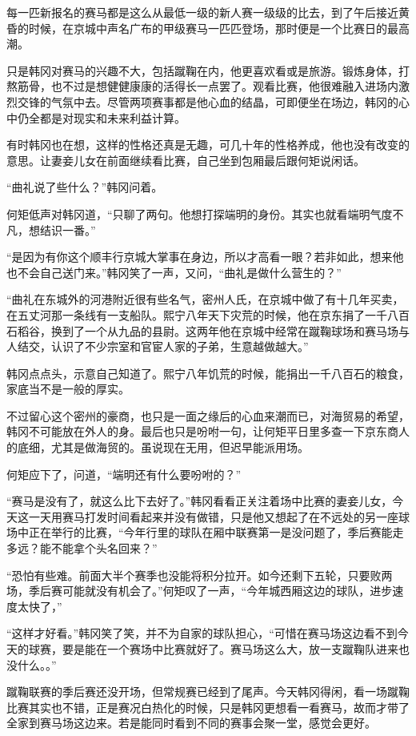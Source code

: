 每一匹新报名的赛马都是这么从最低一级的新人赛一级级的比去，到了午后接近黄昏的时候，在京城中声名广布的甲级赛马一匹匹登场，那时便是一个比赛日的最高潮。

只是韩冈对赛马的兴趣不大，包括蹴鞠在内，他更喜欢看或是旅游。锻炼身体，打熬筋骨，也不过是想健健康康的活得长一点罢了。观看比赛，他很难融入进场内激烈交锋的气氛中去。尽管两项赛事都是他心血的结晶，可即便坐在场边，韩冈的心中仍全都是对现实和未来利益计算。

有时韩冈也在想，这样的性格还真是无趣，可几十年的性格养成，他也没有改变的意思。让妻妾儿女在前面继续看比赛，自己坐到包厢最后跟何矩说闲话。

“曲礼说了些什么？”韩冈问着。

何矩低声对韩冈道，“只聊了两句。他想打探端明的身份。其实也就看端明气度不凡，想结识一番。”

“是因为有你这个顺丰行京城大掌事在身边，所以才高看一眼？若非如此，想来他也不会自己送门来。”韩冈笑了一声，又问，“曲礼是做什么营生的？”

“曲礼在东城外的河港附近很有些名气，密州人氏，在京城中做了有十几年买卖，在五丈河那一条线有一支船队。熙宁八年天下灾荒的时候，他在京东捐了一千八百石稻谷，换到了一个从九品的县尉。这两年他在京城中经常在蹴鞠球场和赛马场与人结交，认识了不少宗室和官宦人家的子弟，生意越做越大。”

韩冈点点头，示意自己知道了。熙宁八年饥荒的时候，能捐出一千八百石的粮食，家底当不是一般的厚实。

不过留心这个密州的豪商，也只是一面之缘后的心血来潮而已，对海贸易的希望，韩冈不可能放在外人的身。最后也只是吩咐一句，让何矩平日里多查一下京东商人的底细，尤其是做海贸的。虽说现在无用，但迟早能派用场。

何矩应下了，问道，“端明还有什么要吩咐的？”

“赛马是没有了，就这么比下去好了。”韩冈看看正关注着场中比赛的妻妾儿女，今天这一天用赛马打发时间看起来并没有做错，只是他又想起了在不远处的另一座球场中正在举行的比赛，“今年行里的球队在厢中联赛第一是没问题了，季后赛能走多远？能不能拿个头名回来？”

“恐怕有些难。前面大半个赛季也没能将积分拉开。如今还剩下五轮，只要败两场，季后赛可能就没有机会了。”何矩叹了一声，“今年城西厢这边的球队，进步速度太快了，”

“这样才好看。”韩冈笑了笑，并不为自家的球队担心，“可惜在赛马场这边看不到今天的球赛，要是能在一个赛场中比赛就好了。赛马场这么大，放一支蹴鞠队进来也没什么。。”

蹴鞠联赛的季后赛还没开场，但常规赛已经到了尾声。今天韩冈得闲，看一场蹴鞠比赛其实也不错，正是赛况白热化的时候，只是韩冈更想看一看赛马，故而才带了全家到赛马场这边来。若是能同时看到不同的赛事会聚一堂，感觉会更好。

